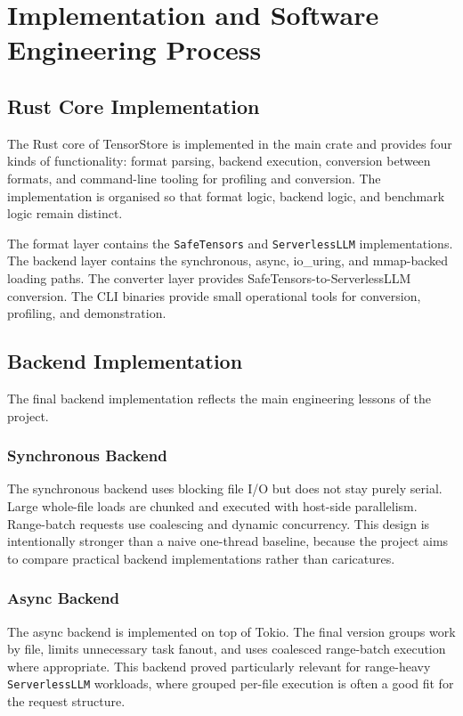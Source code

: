 \chapter{Implementation and Software Engineering Process}
\label{chap:implementation}

\section{Rust Core Implementation}

The Rust core of TensorStore is implemented in the main crate and provides four kinds of functionality: format parsing, backend execution, conversion between formats, and command-line tooling for profiling and conversion. The implementation is organised so that format logic, backend logic, and benchmark logic remain distinct.

The format layer contains the \texttt{SafeTensors} and \texttt{ServerlessLLM} implementations. The backend layer contains the synchronous, async, io\_uring, and mmap-backed loading paths. The converter layer provides SafeTensors-to-ServerlessLLM conversion. The CLI binaries provide small operational tools for conversion, profiling, and demonstration.

\section{Backend Implementation}

The final backend implementation reflects the main engineering lessons of the project.

\subsection{Synchronous Backend}

The synchronous backend uses blocking file I/O but does not stay purely serial. Large whole-file loads are chunked and executed with host-side parallelism. Range-batch requests use coalescing and dynamic concurrency. This design is intentionally stronger than a naive one-thread baseline, because the project aims to compare practical backend implementations rather than caricatures.

\subsection{Async Backend}

The async backend is implemented on top of Tokio. The final version groups work by file, limits unnecessary task fanout, and uses coalesced range-batch execution where appropriate. This backend proved particularly relevant for range-heavy \texttt{ServerlessLLM} workloads, where grouped per-file execution is often a good fit for the request structure.

